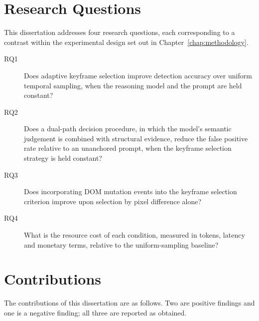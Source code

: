 \section{Research Questions}
\label{sec:rqs}

This dissertation addresses four research questions, each corresponding to
a contrast within the experimental design set out in
Chapter~\ref{chap:methodology}.

\begin{description}
  \item[RQ1] Does adaptive keyframe selection improve detection accuracy
    over uniform temporal sampling, when the reasoning model and the
    prompt are held constant?

  \item[RQ2] Does a dual-path decision procedure, in which the model's
    semantic judgement is combined with structural evidence, reduce the
    false positive rate relative to an unanchored prompt, when the
    keyframe selection strategy is held constant?

  \item[RQ3] Does incorporating DOM mutation events into the keyframe
    selection criterion improve upon selection by pixel difference alone?

  \item[RQ4] What is the resource cost of each condition, measured in
    tokens, latency and monetary terms, relative to the uniform-sampling
    baseline?
\end{description}


\section{Contributions}
\label{sec:contributions}

The contributions of this dissertation are as follows. Two are positive
findings and one is a negative finding; all three are reported as
obtained.

